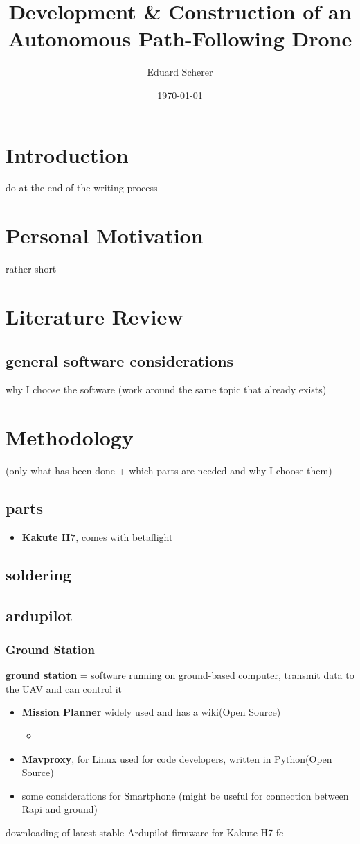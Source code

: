 \documentclass{article}
\author{Eduard Scherer}
\title{Development \& Construction of an Autonomous Path-Following Drone}
\date{\today}
\begin{document}
\maketitle
	\section{Introduction}
	do at the end of the writing process
	\section{Personal Motivation}
	rather short
	\section{Literature Review}
	\subsection{general software considerations}
	why I choose the software
	(work around the same topic that already exists)
	\section{Methodology}
	(only what has been done + which parts are needed and why I choose them)
	\subsection{parts}
	\begin{itemize}
		\item \textbf{Kakute H7}, comes with betaflight
	\end{itemize}
	\subsection{soldering}
	
	\subsection{ardupilot}
	\subsubsection{Ground Station}
	\textbf{ground station} = software running on ground-based computer, transmit data to the UAV and can control it
	\begin{itemize}
		\item \textbf{Mission Planner} widely used and has a wiki(Open Source)
		\begin{itemize}
			\item 
		\end{itemize}
		\item \textbf{Mavproxy}, for Linux used for code developers, written in Python(Open Source)
		\item some considerations for Smartphone (might be useful for connection between Rapi and ground)
	\end{itemize}
	downloading of latest stable Ardupilot firmware for Kakute H7 fc	
\end{document}
